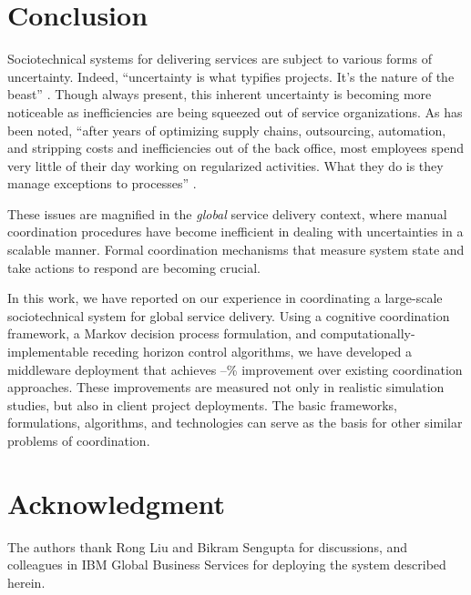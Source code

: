 \documentclass[10pt,journal,cspaper,compsoc]{IEEEtran}
\begin{document}
\section{Conclusion}

Sociotechnical systems for delivering services are subject to various forms of uncertainty. 
Indeed, ``uncertainty is 
what typifies projects. It's the nature of the beast'' \cite{Goldratt1997}.  Though always present,
this inherent uncertainty is becoming more noticeable as inefficiencies are being squeezed out 
of service organizations. As has been noted, ``after years of optimizing supply chains, 
outsourcing, automation, and stripping costs and inefficiencies out of the back office, 
most employees spend very little of their day working on regularized activities. What they 
do is they manage exceptions to processes'' \cite{TapscottW2006}.

These issues are magnified in the \emph{global} service delivery context, where manual coordination
procedures have become inefficient in dealing with uncertainties in a scalable manner.
Formal coordination mechanisms that measure system state and take actions to respond are 
becoming crucial.

In this work, we have reported on our experience in coordinating a large-scale sociotechnical system
for global service delivery.  Using a cognitive coordination framework, a Markov decision process 
formulation, and computationally-implementable receding horizon control algorithms, we 
have developed a middleware deployment that achieves --\% improvement over existing
coordination approaches.  These improvements are measured not only in realistic simulation
studies, but also in client project deployments.  The basic frameworks, formulations, algorithms,
and technologies can serve as the basis for other similar problems of coordination.


\section*{Acknowledgment}
The authors thank Rong Liu and Bikram Sengupta for discussions, and colleagues in IBM Global Business Services for 
deploying the system described herein.

 

\end{document}
